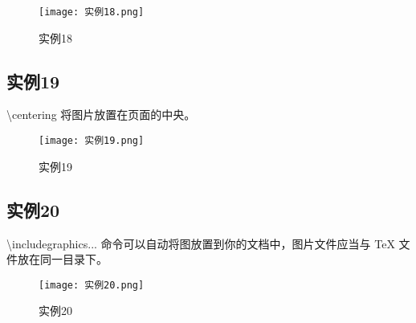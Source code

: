 \documentclass[a4paper, 12pt]{article}
\begin{document}
\begin{figure}[h!]
  \centering
  \texttt{[image: 实例18.png]}
  \caption{实例18}
\end{figure}

\subsection{实例19}
\textbackslash centering 将图片放置在页面的中央。

\begin{figure}[h!]
  \centering
  \texttt{[image: 实例19.png]}
  \caption{实例19}
\end{figure}

\subsection{实例20}
\textbackslash includegraphics{...} 命令可以自动将图放置到你的文档中，图片文件应当与 TeX 文件放在同一目录下。

\begin{figure}[h!]
  \centering
  \texttt{[image: 实例20.png]}
  \caption{实例20}
\end{figure}
\end{document}

